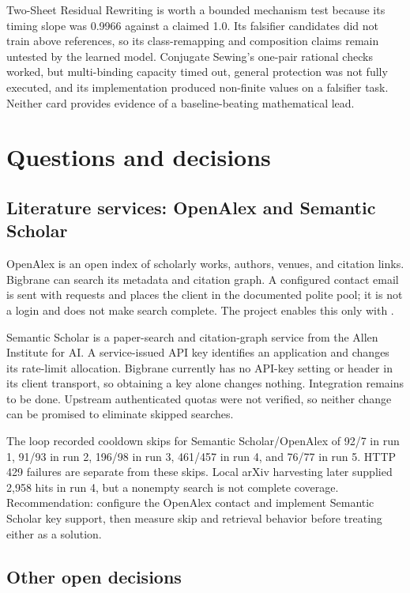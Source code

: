Two-Sheet Residual Rewriting is worth a bounded mechanism test because its timing slope was 0.9966 against a claimed 1.0. Its falsifier candidates did not train above references, so its class-remapping and composition claims remain untested by the learned model. Conjugate Sewing's one-pair rational checks worked, but multi-binding capacity timed out, general protection was not fully executed, and its implementation produced non-finite values on a falsifier task. Neither card provides evidence of a baseline-beating mathematical lead.

\section{Questions and decisions}

\subsection{Literature services: OpenAlex and Semantic Scholar}

OpenAlex is an open index of scholarly works, authors, venues, and citation links. Bigbrane can search its metadata and citation graph. A configured contact email is sent with requests and places the client in the documented polite pool; it is not a login and does not make search complete. The project enables this only with .

Semantic Scholar is a paper-search and citation-graph service from the Allen Institute for AI. A service-issued API key identifies an application and changes its rate-limit allocation. Bigbrane currently has no API-key setting or  header in its client transport, so obtaining a key alone changes nothing. Integration remains to be done. Upstream authenticated quotas were not verified, so neither change can be promised to eliminate skipped searches.

The loop recorded cooldown skips for Semantic Scholar/OpenAlex of 92/7 in run 1, 91/93 in run 2, 196/98 in run 3, 461/457 in run 4, and 76/77 in run 5. HTTP 429 failures are separate from these skips. Local arXiv harvesting later supplied 2,958 hits in run 4, but a nonempty search is not complete coverage. Recommendation: configure the OpenAlex contact and implement Semantic Scholar key support, then measure skip and retrieval behavior before treating either as a solution.

\subsection{Other open decisions}

